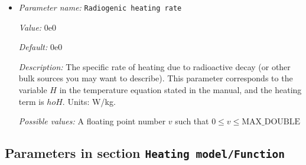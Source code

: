 \begin{itemize}
\item {\it Parameter name:} {\tt Radiogenic heating rate}
\label{parameters:Heating model/Constant heating/Radiogenic heating rate}


{\it Value:} 0e0


{\it Default:} 0e0


{\it Description:} The specific rate of heating due to radioactive decay (or other bulk sources you may want to describe). This parameter corresponds to the variable $H$ in the temperature equation stated in the manual, and the heating term is $
ho H$. Units: W/kg.


{\it Possible values:} A floating point number $v$ such that $0 \leq v \leq \text{MAX\_DOUBLE}$
\end{itemize}

\subsection{Parameters in section \tt Heating model/Function}
\label{parameters:Heating_20model/Function}

